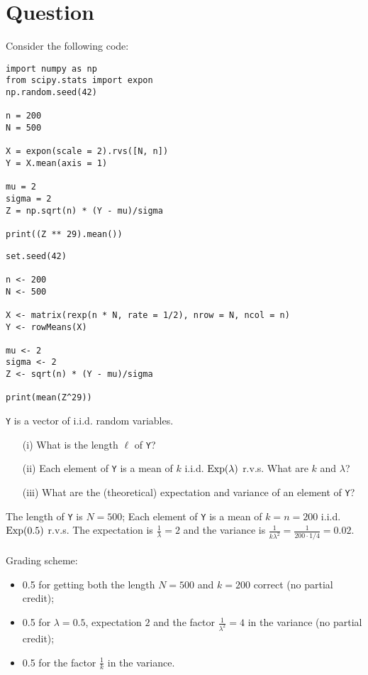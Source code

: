 \section{Question}

Consider the following code:

\begin{verbatim}
import numpy as np
from scipy.stats import expon
np.random.seed(42)

n = 200
N = 500

X = expon(scale = 2).rvs([N, n])
Y = X.mean(axis = 1)

mu = 2
sigma = 2
Z = np.sqrt(n) * (Y - mu)/sigma

print((Z ** 29).mean())
\end{verbatim}

\begin{verbatim}
set.seed(42)

n <- 200
N <- 500

X <- matrix(rexp(n * N, rate = 1/2), nrow = N, ncol = n)
Y <- rowMeans(X)

mu <- 2
sigma <- 2
Z <- sqrt(n) * (Y - mu)/sigma

print(mean(Z^29))
\end{verbatim}

\vspace*{20pt}


\begin{exercise}[1.5]
\texttt{Y} is a vector of i.i.d. random variables.

\begin{itemize}
\item[(i)] What is the length $\ell$ of \texttt{Y}?
\item[(ii)] Each element of \texttt{Y} is a mean of $k$ i.i.d. $\mathrm{Exp}(\lambda)$ r.v.s.
What are $k$ and $\lambda$?  
\item[(iii)] What are the (theoretical) expectation and variance of an element of \texttt{Y}? 
\end{itemize} 

\begin{solution}
The length of \texttt{Y} is $N = 500$;  Each element of \texttt{Y} is a mean of $k = n = 200$ i.i.d. $\mathrm{Exp}(0.5)$ r.v.s.
The expectation is $\frac1\lambda = 2$ and the variance is $\frac1{k \lambda^2} = \frac1{200\cdot1/4} = 0.02$. \\ \\
Grading scheme:
\begin{itemize}
\item 0.5 for getting both the length $N=500$ and  $k=200$ correct (no partial credit);
\item 0.5 for $\lambda = 0.5$, expectation $2$ and the factor $\frac1{\lambda^2} = 4$ in the variance (no partial credit);
\item 0.5 for the factor $\frac1{k}$ in the variance.
\end{itemize}
\end{solution}
\end{exercise}

